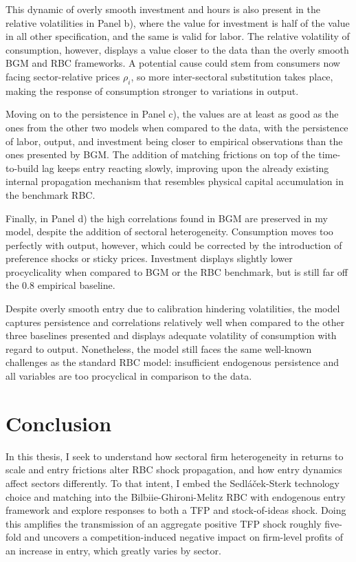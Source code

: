 \documentclass[a4paper,12pt]{article} %
\numberwithin{equation}{section} %
\numberwithin{figure}{section}
\numberwithin{table}{section}
\begin{document}
This dynamic of overly smooth investment and hours is also present in the relative volatilities in Panel b), where the value 
for investment is half of the value in all other specification, and the same is valid for labor. The relative volatility of
consumption, however, displays a value closer to the data than the overly smooth BGM and RBC frameworks. A potential cause could 
stem from consumers now facing sector-relative prices $\rho_i$, so more inter-sectoral substitution takes place, making the 
response of consumption stronger to variations in output.

Moving on to the persistence in Panel c), the values are at least as good as the ones from the other two models 
when compared to the data, with the persistence of labor, output, and investment being closer to 
empirical observations than the ones presented by BGM. The addition of matching frictions on top of the 
time-to-build lag keeps entry reacting slowly, improving upon the already existing internal propagation mechanism 
that resembles physical capital accumulation in the benchmark RBC.

Finally, in Panel d) the high correlations found in BGM are preserved in my model, despite the addition of sectoral heterogeneity.
Consumption moves too perfectly with output, however, which could be corrected by the introduction of preference shocks or sticky
prices. Investment displays slightly lower procyclicality when compared to BGM or the RBC benchmark, but is still far off the $0.8$ 
empirical baseline. 

Despite overly smooth entry due to calibration hindering volatilities, the model captures persistence and 
correlations relatively well when compared to the other three baselines presented and displays adequate volatility of consumption
with regard to output. Nonetheless, the model still faces the same well-known challenges as the standard RBC model: 
insufficient endogenous persistence and all variables are too procyclical in  comparison to the data.


\section{Conclusion}
\label{sec:conclusion}

In this thesis, I seek to understand how sectoral firm heterogeneity in returns to scale and entry frictions alter RBC shock propagation, and how
entry dynamics affect sectors differently.
To that intent, I embed the Sedláček-Sterk technology choice and matching into the Bilbiie-Ghironi-Melitz RBC with endogenous entry framework and explore
responses to both a TFP and stock-of-ideas shock.
Doing this amplifies the transmission of an aggregate positive TFP shock roughly five-fold and uncovers a competition-induced negative 
impact on firm-level profits of an increase in entry, which greatly varies by sector. 
\end{document}
